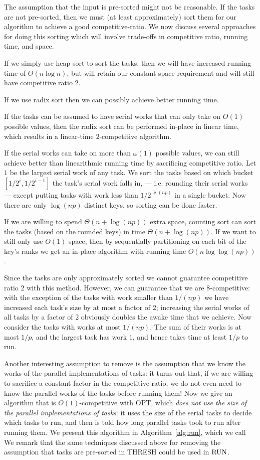The assumption that the input is pre-sorted might not be
reasonable. If the tasks are not pre-sorted, then we must (at
least approximately) sort them for our algorithm to achieve a
good competitive-ratio. We now discuss several approaches for
doing this sorting which will involve trade-offs in competitive
ratio, running time, and space.

If we simply use heap sort to sort the tasks, then we
will have increased running time of $\Theta(n \log n)$, but will
retain our constant-space requirement and will still have
competitive ratio $2$.

If we use radix sort then we can possibly achieve better
running time. 

If the tasks can be assumed to
have serial works that can only take on $O(1)$ possible
values, then the radix sort can be performed in-place in linear
time, which results in a linear-time $2$-competitive algorithm. 

If the serial works can take on more than $\omega(1)$ possible
values, we can still achieve better than linearithmic running
time by sacrificing competitive ratio. Let $1$ be the largest
serial work of any task. We sort the tasks based on which bucket
$[1/2^i, 1/2^{i-1}]$ the task's serial work falls in, --- i.e.
rounding their serial works ---  except putting tasks with work
less than $1/2^{\lg (np)}$ in a single bucket. Now there are only
$\log (np)$ distinct keys, so sorting can be done faster. 

If we are willing to spend $\Theta(n + \log (np))$
extra space, counting sort can sort the tasks (based on the
rounded keys) in time $\Theta(n+\log(np))$. 
If we want to still only use $O(1)$ space, then by
sequentially partitioning on each bit of the key's ranks we get
an in-place algorithm with running time $O(n \log \log (np))$.

Since the tasks are only approximately sorted we cannot
guarantee competitive ratio $2$ with this method. However, we can
guarantee that we are $8$-competitive: with the exception of the
tasks with work smaller than $1/(np)$ we have increased each
task's size by at most a factor of $2$; increasing the serial
works of all tasks by a factor of $2$ obviously doubles the awake
time that we achieve. Now consider the tasks with works at most
$1/(np)$. The sum of their works is at most $1/p$, and the
largest task has work $1$, and hence takes time at least $1/p$ to
run.

Another interesting assumption to remove is the assumption that
we know the works of the parallel implementations of tasks: it
turns out that, if we are willing to sacrifice a constant-factor
in the competitive ratio, we do not even need to know the
parallel works of the tasks before running them! Now we give an
algorithm that is $O(1)$-competitive with OPT, which \emph{does not
use the size of the parallel implementations of tasks}: it uses
the size of the serial tasks to decide which tasks to run, and
then is told how long parallel tasks took to run after running
them. We present this algorithm in Algorithm~\ref{alg:run}, which
we call  We remark that the same techniques discussed
above for removing the assumption that tasks are pre-sorted in
THRESH could be used in $\operatorname{\text{RUN}}$.

